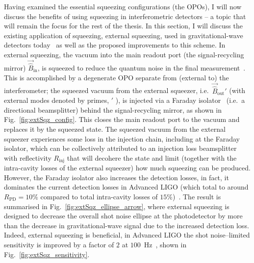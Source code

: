 Having examined the essential squeezing configurations (the OPOs), I will now discuss the benefits of using squeezing in interferometric detectors -- a topic that will remain the focus for the rest of the thesis. In this section, I will discuss the existing application of squeezing, external squeezing, used in gravitational-wave detectors today~\cite{} as well as the proposed improvements to this scheme. 
In external squeezing, the vacuum into the main readout port (the signal-recycling mirror) $\vec{\hat B}_\text{in}$, is squeezed to reduce the quantum noise in the final measurement~\cite{}. This is accomplished by a degenerate OPO separate from (external to) the interferometer; the squeezed vacuum from the external squeezer, i.e.\ $\vec{\hat B}_\text{out}'$ (with external modes denoted by primes, $'$ ), is injected via a Faraday isolator~\cite{} (i.e.\ a directional beamsplitter) behind the signal-recycling mirror, as shown in Fig.~\ref{fig:extSqz_config}. This closes the main readout port to the vacuum and replaces it by the squeezed state. The squeezed vacuum from the external squeezer experiences some loss in the injection chain, including at  the Faraday isolator, which can be collectively attributed to an injection loss beamsplitter with reflectivity $R_\text{inj}$ that will decohere the state and limit (together with the intra-cavity losses of the external squeezer) how much squeezing can be produced. However, the Faraday isolator also increases the detection losses, in fact, it dominates the current detection losses in Advanced LIGO (which total to around $R_\text{PD}=10\%$ compared to total intra-cavity losses of $15\%$)~\cite{}. The result is summarised in Fig.~\ref{fig:extSqz_ellipse_arrow}, where external squeezing is designed to decrease the overall shot noise ellipse at the photodetector by more than the decrease in gravitational-wave signal due to the increased detection loss. Indeed, external squeezing is beneficial, in Advanced LIGO the shot noise--limited sensitivity is improved by a factor of $2$ at $100$~Hz~\cite{tseQuantumEnhancedAdvancedLIGO2019}, shown in Fig.~\ref{fig:extSqz_sensitivity}.  

